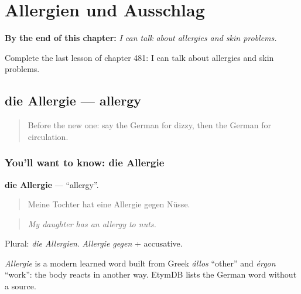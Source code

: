 
\chapter{Allergien und Ausschlag}
\label{ch:ge-allergien-und-ausschlag}

\begin{chapteropening}
\textbf{By the end of this chapter:} \emph{I can talk about allergies and skin problems.}

Complete the last lesson of chapter 481: I can talk about allergies and skin problems.
\end{chapteropening}

\section[die Allergie]{die Allergie — allergy}

\label{lesson:GE-C481-allergie}



\begin{quote}
Before the new one: say the German for dizzy, then the German for circulation.
\end{quote}

\subsection*{You'll want to know: die Allergie}
\textbf{die Allergie} — \textquotedblleft{}allergy\textquotedblright{}.

\begin{quote}
Meine Tochter hat eine Allergie gegen Nüsse.
\end{quote}

\begin{quote}
\emph{My daughter has an allergy to nuts.}
\end{quote}

Plural: \emph{die Allergien}. \emph{Allergie gegen} + accusative.

\begin{cousinweb}
\emph{Allergie} is a modern learned word built from Greek \emph{állos} \textquotedblleft{}other\textquotedblright{} and \emph{érgon} \textquotedblleft{}work\textquotedblright{}: the body reacts in another way. EtymDB lists the German word without a source.
\end{cousinweb}

